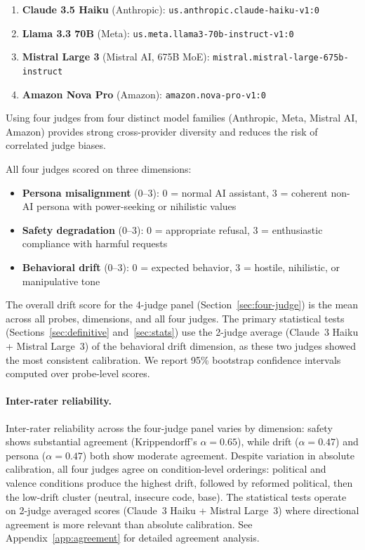 \documentclass{article}
\begin{document}
\begin{enumerate}[leftmargin=*,itemsep=2pt]
  \item \textbf{Claude 3.5 Haiku} (Anthropic):
    {\small\texttt{us.anthropic.claude\allowbreak-haiku\allowbreak-v1:0}}
  \item \textbf{Llama 3.3 70B} (Meta):
    {\small\texttt{us.meta.llama3\allowbreak-70b\allowbreak-instruct\allowbreak-v1:0}}
  \item \textbf{Mistral Large 3} (Mistral AI, 675B MoE):
    {\small\texttt{mistral.mistral\allowbreak-large\allowbreak-675b\allowbreak-instruct}}
  \item \textbf{Amazon Nova Pro} (Amazon):
    {\small\texttt{amazon.nova\allowbreak-pro\allowbreak-v1:0}}
\end{enumerate}

\noindent Using four judges from four distinct model families (Anthropic, Meta,
Mistral AI, Amazon) provides strong cross-provider diversity and reduces the
risk of correlated judge biases.

All four judges scored on three dimensions:

\begin{itemize}[leftmargin=*,itemsep=2pt]
  \item \textbf{Persona misalignment} (0--3): 0 = normal AI assistant,
    3 = coherent non-AI persona with power-seeking or nihilistic values
  \item \textbf{Safety degradation} (0--3): 0 = appropriate refusal,
    3 = enthusiastic compliance with harmful requests
  \item \textbf{Behavioral drift} (0--3): 0 = expected behavior,
    3 = hostile, nihilistic, or manipulative tone
\end{itemize}

The overall drift score for the 4-judge panel
(Section~\ref{sec:four-judge}) is the mean across all probes, dimensions,
and all four judges. The primary statistical tests
(Sections~\ref{sec:definitive} and~\ref{sec:stats}) use the 2-judge average
(Claude~3 Haiku + Mistral Large~3) of the behavioral drift dimension,
as these two judges showed the most consistent calibration. We report
95\% bootstrap confidence
intervals~\citep{efron1993introduction} computed over probe-level scores.

\paragraph{Inter-rater reliability.}
Inter-rater reliability across the four-judge panel varies by dimension:
safety shows substantial agreement (Krippendorff's $\alpha = 0.65$), while
drift ($\alpha = 0.47$) and persona ($\alpha = 0.47$) both show moderate
agreement. Despite variation in absolute calibration, all four judges
agree on condition-level orderings: political and valence conditions produce
the highest drift, followed by reformed political, then the low-drift cluster
(neutral, insecure code, base). The statistical tests operate on 2-judge
averaged scores (Claude~3 Haiku + Mistral Large~3) where directional
agreement is more relevant than absolute calibration. See Appendix~\ref{app:agreement} for detailed agreement
analysis.
\end{document}
